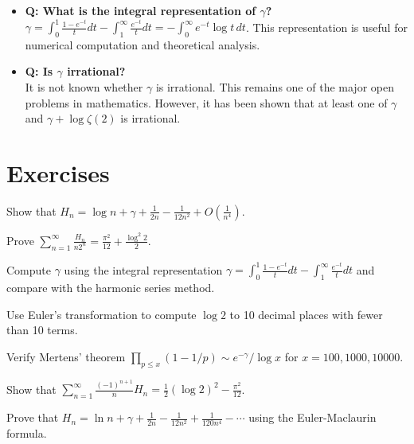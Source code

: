 \begin{itemize}
\item \textbf{Q: What is the integral representation of $\gamma$?} \\
$\gamma = \int_0^1 \frac{1-e^{-t}}{t}dt - \int_1^\infty \frac{e^{-t}}{t}dt = -\int_0^\infty e^{-t}\log t \, dt$. This representation is useful for numerical computation and theoretical analysis.

\item \textbf{Q: Is $\gamma$ irrational?} \\
It is not known whether $\gamma$ is irrational. This remains one of the major open problems in mathematics. However, it has been shown that at least one of $\gamma$ and $\gamma + \log \zeta(2)$ is irrational.
\end{itemize}

\section{Exercises}

\begin{exercise}
Show that $H_n = \log n + \gamma + \frac{1}{2n} - \frac{1}{12n^2} + O(\frac{1}{n^4})$.
\end{exercise}

\begin{exercise}
Prove $\sum_{n=1}^\infty \frac{H_n}{n 2^n} = \frac{\pi^2}{12} + \frac{\log^2 2}{2}$.
\end{exercise}

\begin{exercise}
Compute $\gamma$ using the integral representation $\gamma = \int_0^1 \frac{1-e^{-t}}{t} dt - \int_1^\infty \frac{e^{-t}}{t} dt$ and compare with the harmonic series method.
\end{exercise}

\begin{exercise}
Use Euler's transformation to compute $\log 2$ to 10 decimal places with fewer than 10 terms.
\end{exercise}

\begin{exercise}
Verify Mertens' theorem $\prod_{p \le x} (1 - 1/p) \sim e^{-\gamma}/\log x$ for $x = 100, 1000, 10000$.
\end{exercise}

\begin{exercise}
Show that $\sum_{n=1}^\infty \frac{(-1)^{n+1}}{n} H_n = \frac{1}{2}(\log 2)^2 - \frac{\pi^2}{12}$.
\end{exercise}

\begin{exercise}
Prove that $H_n = \ln n + \gamma + \frac{1}{2n} - \frac{1}{12n^2} + \frac{1}{120n^4} - \cdots$ using the Euler-Maclaurin formula.
\end{exercise}

